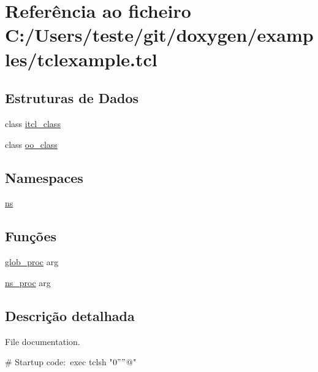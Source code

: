 \hypertarget{tclexample_8tcl}{\section{Referência ao ficheiro C\-:/\-Users/teste/git/doxygen/examples/tclexample.tcl}
\label{tclexample_8tcl}
}
\subsection*{Estruturas de Dados}
\begin{DoxyCompactItemize}
\item 
class \hyperlink{classns_1_1itcl__class}{itcl\-\_\-class}
\item 
class \hyperlink{classns_1_1oo__class}{oo\-\_\-class}
\end{DoxyCompactItemize}
\subsection*{Namespaces}
\begin{DoxyCompactItemize}
\item 
\hyperlink{namespacens}{ns}
\end{DoxyCompactItemize}
\subsection*{Funções}
\begin{DoxyCompactItemize}
\item 
\hyperlink{tclexample_8tcl_a6fd2deb737d7421831004f9302f451ee}{glob\-\_\-proc} arg
\item 
\hyperlink{namespacens_a1429cbe84d32b17ea4783e5c5c00615b}{ns\-\_\-proc} arg
\end{DoxyCompactItemize}


\subsection{Descrição detalhada}
File documentation.

\begin{DoxyVerb}# Startup code:\
exec tclsh "$0" "$@"\end{DoxyVerb}
 

